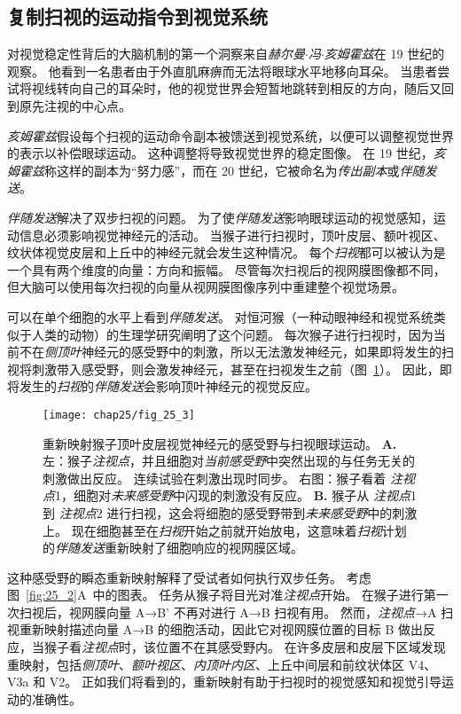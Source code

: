 \subsection{复制扫视的运动指令到视觉系统}

对视觉稳定性背后的大脑机制的第一个洞察来自\textit{赫尔曼$\cdot$冯$\cdot$亥姆霍兹}在 19 世纪的观察。
他看到一名患者由于外直肌麻痹而无法将眼球水平地移向耳朵。
当患者尝试将视线转向自己的耳朵时，他的视觉世界会短暂地跳转到相反的方向，随后又回到原先注视的中心点。


\textit{亥姆霍兹}假设每个扫视的运动命令副本被馈送到视觉系统，以便可以调整视觉世界的表示以补偿眼球运动。
这种调整将导致视觉世界的稳定图像。
在 19 世纪，\textit{亥姆霍兹}称这样的副本为“努力感”，而在 20 世纪，它被命名为\textit{传出副本}或\textit{伴随发送}。


\textit{伴随发送}解决了双步扫视的问题。
为了使\textit{伴随发送}影响眼球运动的视觉感知，运动信息必须影响视觉神经元的活动。
当猴子进行扫视时，顶叶皮层、额叶视区、纹状体视觉皮层和上丘中的神经元就会发生这种情况。
每个\textit{扫视}都可以被认为是一个具有两个维度的向量：方向和振幅。
尽管每次扫视后的视网膜图像都不同，但大脑可以使用每次扫视的向量从视网膜图像序列中重建整个视觉场景。


可以在单个细胞的水平上看到\textit{伴随发送}。
对恒河猴（一种动眼神经和视觉系统类似于人类的动物）的生理学研究阐明了这个问题。
每次猴子进行扫视时，因为当前不在\textit{侧顶叶}神经元的感受野中的刺激，所以无法激发神经元，如果即将发生的扫视将刺激带入感受野，则会激发神经元，甚至在扫视发生之前（图~\ref{fig:25_3}）。
因此，即将发生的\textit{扫视}的\textit{伴随发送}会影响顶叶神经元的视觉反应。


\begin{figure}[htbp]
	\centering
	\texttt{[image: chap25/fig\_25\_3]}
	\caption{重新映射猴子顶叶皮层视觉神经元的感受野与扫视眼球运动\cite{duhamel1992updating}。
		\textbf{A.} 左：猴子\textit{注视点}，并且细胞对\textit{当前感受野}中突然出现的与任务无关的刺激做出反应。
		连续试验在刺激出现时同步。
		右图：猴子看着 \textit{注视点}1，细胞对\textit{未来感受野}中闪现的刺激没有反应。
		\textbf{B.} 猴子从 \textit{注视点}1 到 \textit{注视点}2 进行扫视，这会将细胞的感受野带到\textit{未来感受野}中的刺激上。
		现在细胞甚至在\textit{扫视}开始之前就开始放电，这意味着\textit{扫视}计划的\textit{伴随发送}重新映射了细胞响应的视网膜区域。}
	\label{fig:25_3}
\end{figure}


这种感受野的瞬态重新映射解释了受试者如何执行双步任务。
考虑图~\ref{fig:25_2}A~中的图表。
任务从猴子将目光对准\textit{注视点}开始。
在猴子进行第一次扫视后，视网膜向量 A→B' 不再对进行 A→B 扫视有用。
然而，\textit{注视点}→A 扫视重新映射描述向量 A→B 的细胞活动，因此它对视网膜位置的目标 B 做出反应，当猴子看\textit{注视点}时，该位置不在其感受野内。
在许多皮层和皮层下区域发现重映射，包括\textit{侧顶叶}、\textit{额叶视区}、\textit{内顶叶内区}、上丘中间层和前纹状体区 V4、V3a 和 V2。
正如我们将看到的，重新映射有助于扫视时的视觉感知和视觉引导运动的准确性。


